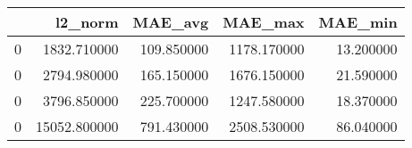 \begin{tabular}{lrrrr}
\toprule
 & l2_norm & MAE_avg & MAE_max & MAE_min \\
\midrule
0 & 1832.710000 & 109.850000 & 1178.170000 & 13.200000 \\
0 & 2794.980000 & 165.150000 & 1676.150000 & 21.590000 \\
0 & 3796.850000 & 225.700000 & 1247.580000 & 18.370000 \\
0 & 15052.800000 & 791.430000 & 2508.530000 & 86.040000 \\
\bottomrule
\end{tabular}
